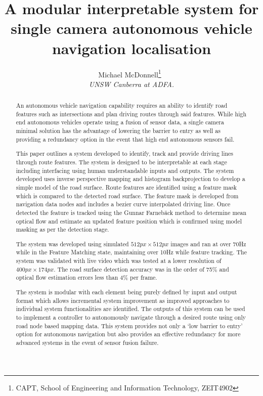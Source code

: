\documentclass[]{aiaa-tc}%
\title{A modular interpretable system for single camera autonomous vehicle navigation localisation}
\author{
  Michael McDonnell\thanks{CAPT, School of Engineering and Information Technology, ZEIT4902}\
  \\
  {\normalsize\itshape
   UNSW Canberra at ADFA.}\\
  }
\begin{document}
\maketitle


\begin{abstract}

An autonomous vehicle navigation capability requires an ability to identify road features such as intersections and plan driving routes through said features. While high end autonomous vehicles operate using a fusion of sensor data, a single camera minimal solution has the advantage of lowering the barrier to entry as well as providing a redundancy option in the event that high end autonomous sensors fail.

This paper outlines a system developed to identify, track and provide driving lines through route features. The system is designed to be interpretable at each stage including interfacing using human understandable inputs and outputs. The system developed uses inverse perspective mapping and histogram backprojection to develop a simple model of the road surface. Route features are identified using a feature mask which is compared to the detected road surface. The feature mask is developed from navigation data nodes and includes a bezier curve interpolated driving line. Once detected the feature is tracked using the Gunnar Farneb{\"a}ck method to determine mean optical flow and estimate an updated feature position which is confirmed using model masking as per the detection stage.

The system was developed using simulated $512px \times 512px$ images and ran at over 70Hz while in the Feature Matching state, maintaining over 10Hz while feature tracking. The system was validated with live video which was tested at a lower resolution of $400px \times 174px$. The road surface detection accuracy was in the order of 75\% and optical flow estimation errors less than 4\% per frame.

The system is modular with each element being purely defined by input and output format which allows incremental system improvement as improved approaches to individual system functionalities are identified. The outputs of this system can be used to implement a controller to autonomously navigate through a desired route using only road node based mapping data. This system provides not only a `low barrier to entry' option for autonomous navigation but also provides an effective redundancy for more advanced systems in the event of sensor fusion failure.

\end{abstract}
\end{document}
